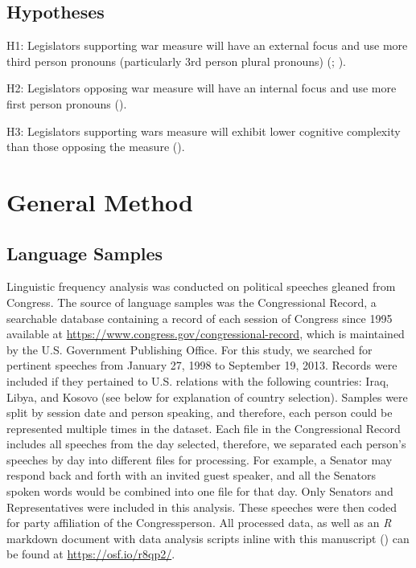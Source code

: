 \documentclass[jou,a4paper]{apa6}
\begin{document}
\subsection{Hypotheses}

H1: Legislators supporting war measure will have an external focus and use more third person pronouns (particularly 3rd person plural pronouns) (\cite{Abe2012}; \cite{Matsumoto2013}).

H2: Legislators opposing war measure will have an internal focus and use more first person pronouns (\cite{Abe2012}).

H3: Legislators supporting wars measure will exhibit lower cognitive complexity than those opposing the measure (\cite{Matsumoto2013}).

\section{General Method}

\subsection{Language Samples}

Linguistic frequency analysis was conducted on political speeches gleaned from Congress. The source of language samples was the Congressional Record, a searchable database containing a record of each session of Congress since 1995 available at \url{https://www.congress.gov/congressional-record}, which is maintained by the U.S. Government Publishing Office. For this study, we searched for pertinent speeches from January 27, 1998 to September 19, 2013. Records were included if they pertained to U.S. relations with the following countries: Iraq, Libya, and Kosovo (see below for explanation of country selection). Samples were split by session date and person speaking, and therefore, each person could be represented multiple times in the dataset. Each file in the Congressional Record includes all speeches from the day selected, therefore, we separated each person's speeches by day into different files for processing. For example, a Senator may respond back and forth with an invited guest speaker, and all the Senators spoken words would be combined into one file for that day. Only Senators and Representatives were included in this analysis. These speeches were then coded for party affiliation of the Congressperson. All processed data, as well as an \emph{R} markdown document with data analysis scripts inline with this manuscript (\cite{Aust2017}) can be found at \url{https://osf.io/r8qp2/}.
\end{document}
